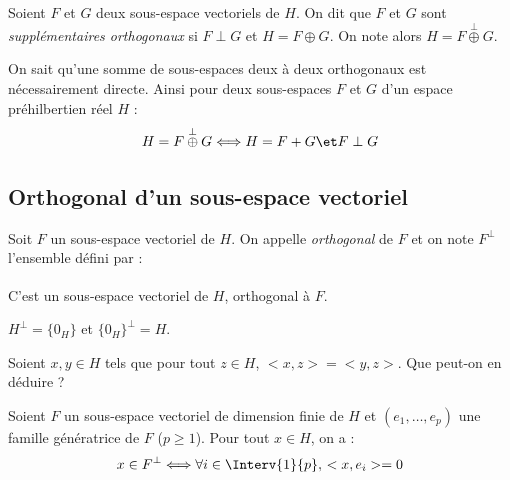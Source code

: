 \documentclass[a4paper,10pt]{report}
\begin{document}
\begin{defin} Soient $F$ et $G$ deux sous-espace vectoriels de $H$. On dit que $F$ et $G$ sont \textit{supplémentaires orthogonaux} si $F \perp G$ et $H=F \oplus G $. On note alors $H= F \overset{\perp}{\oplus} G$.
\end{defin}

\begin{rem} On sait qu'une somme de sous-espaces deux à deux orthogonaux est nécessairement directe. Ainsi pour deux sous-espaces $F$ et $G$ d'un espace préhilbertien réel $H$ : 
$$H= F \overset{\perp}{\oplus} G  \Longleftrightarrow  H = F+G \et F \perp G$$
\end{rem}

\subsection{Orthogonal d'un sous-espace vectoriel}

\begin{defip} Soit $F$ un sous-espace vectoriel de $H$. On appelle \textit{orthogonal} de $F$ et on note $F^{\perp}$ l'ensemble défini par :
$$ \phantom{F^{\perp} = \lbrace y \in H \, \vert \, \forall x \in F, \, <x,y>=0 \rbrace}$$
C'est un sous-espace vectoriel de $H$, orthogonal à $F$.
\end{defip}

\begin{preuve}

\vspace{6cm}
\end{preuve}

\begin{prop} $H^{\perp} = \lbrace 0_H \rbrace$ et $\lbrace 0_H \rbrace^{\perp} = H$.
\end{prop}

\begin{preuve}
\vspace{2cm}
\end{preuve}

\begin{exa} Soient $x,y \in H$ tels que pour tout $z \in H$, $<x,z>=<y,z>$. Que peut-on en déduire ?
\end{exa}

\begin{prop} Soient $F$ un sous-espace vectoriel de dimension finie de $H$ et $(e_1, \ldots, e_p)$ une famille génératrice de $F$ ($p \geq 1$). Pour tout $x \in H$, on a :
$$ x \in F^{\perp} \Longleftrightarrow \forall i \in \Interv{1}{p}, \, <x,e_i> =0 $$
\end{prop}
\end{document}
